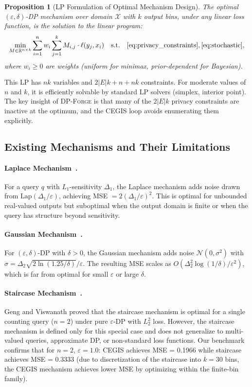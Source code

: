 \documentclass[11pt,a4paper]{article}
\newcommand{\dpforge}{\textsc{DP-Forge}}
\newcommand{\eps}{\varepsilon}
\newcommand{\R}{\mathbb{R}}
\newcommand{\cX}{\mathcal{X}}
\newtheorem{proposition}[theorem]{Proposition}
\begin{document}
\begin{proposition}[LP Formulation of Optimal Mechanism Design]
\label{prop:lp}
The optimal $(\eps,\delta)$-DP mechanism over domain $\cX$ with $k$ output bins,
under any linear loss function, is the solution to the linear program:
\[
  \min_{M \in \R^{n \times k}} \sum_{i=1}^{n} w_i \sum_{j=1}^{k} M_{i,j} \cdot \ell(y_j, x_i)
  \quad \text{s.t.} \quad \eqref{eq:privacy_constraints}, \eqref{eq:stochastic},
\]
where $w_i \ge 0$ are weights (uniform for minimax, prior-dependent for Bayesian).
\end{proposition}

This LP has $nk$ variables and $2|E|k + n + nk$ constraints.
For moderate values of $n$ and $k$, it is efficiently solvable by standard
LP solvers (simplex, interior point).  The key insight of \dpforge{} is that
many of the $2|E|k$ privacy constraints are inactive at the optimum, and the
CEGIS loop avoids enumerating them explicitly.

\subsection{Existing Mechanisms and Their Limitations}
\label{subsec:existing}

\paragraph{Laplace Mechanism~\cite{dwork2006calibrating}.}
For a query $q$ with $L_1$-sensitivity $\Delta_1$, the Laplace mechanism adds
noise drawn from $\text{Lap}(\Delta_1 / \eps)$, achieving MSE $= 2(\Delta_1/\eps)^2$.
This is optimal for unbounded real-valued outputs but suboptimal when the output
domain is finite or when the query has structure beyond sensitivity.

\paragraph{Gaussian Mechanism~\cite{balle2018improving}.}
For $(\eps,\delta)$-DP with $\delta > 0$, the Gaussian mechanism adds noise
$\mathcal{N}(0, \sigma^2)$ with $\sigma = \Delta_2 \sqrt{2\ln(1.25/\delta)}/\eps$.
The resulting MSE scales as $O(\Delta_2^2 \log(1/\delta) / \eps^2)$, which is
far from optimal for small $\eps$ or large $\delta$.

\paragraph{Staircase Mechanism~\cite{geng2014optimal}.}
Geng and Viswanath proved that the staircase mechanism is optimal for a single
counting query ($n=2$) under pure $\eps$-DP with $L_2^2$ loss.  However, the
staircase mechanism is defined only for this special case and does not generalize
to multi-valued queries, approximate DP, or non-standard loss functions.  Our
benchmark confirms that for $n=2$, $\eps=1.0$: CEGIS achieves MSE = 0.1966 while
staircase achieves MSE = 0.3333 (due to discretization of the staircase into $k=30$
bins, the CEGIS mechanism achieves lower MSE by optimizing within the finite-bin family).
\end{document}
